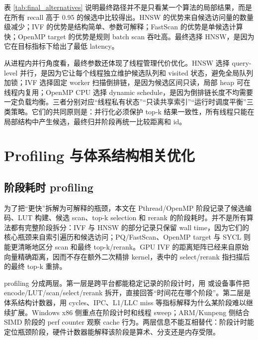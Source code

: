 \documentclass[11pt,a4paper]{article}
\newcommand{\code}[1]{\texttt{\detokenize{#1}}}
\begin{document}
表 \ref{tab:final_alternatives} 说明最终路径并不是只看某一个算法的局部结果，而是在所有 recall 高于 0.95 的候选中比较得出。HNSW 的优势来自候选访问量的数量级减少；IVF 的优势是结构简单、参数可解释；FastScan 的优势是单候选计算快；OpenMP target 的优势是规则 batch scan 吞吐高。最终选择 HNSW，是因为它在目标指标下给出了最低 latency。

从进程内并行角度看，最终参数还体现了线程管理代价优化。HNSW 选择 query-level 并行，是因为它让每个线程独立维护候选队列和 visited 状态，避免全局队列加锁；IVF 选择固定 worker 扫描倒排链，是因为候选区间只读，局部 heap 可在线程内复用；OpenMP CPU 选择 dynamic schedule，是因为倒排链长度不均需要一定负载均衡。三者分别对应“线程私有状态”“只读共享索引”“运行时调度平衡”三类策略。它们的共同原则是：并行化必须保护 top-k 结果一致性，所有线程只能在局部结构中产生候选，最终归并阶段再统一比较距离和 id。

\section{Profiling 与体系结构相关优化}
\label{sec:profiling}

\subsection{阶段耗时 profiling}

为了把“更快”拆解为可解释的瓶颈，本文在 Pthread/OpenMP 阶段记录了候选编码、LUT 构建、候选 scan、top-k selection 和 rerank 的阶段耗时。并不是所有算法都有完整阶段拆分：IVF 与 HNSW 的部分记录只保留 wall time，因为它们的核心瓶颈来自索引遍历和候选访问；PQ/FastScan、OpenMP target 与 SYCL 则能更清晰地区分 scan 和最终 top-k/rerank。GPU IVF 的距离矩阵已经来自原始向量精确距离，因而不存在额外二次精排 kernel，表中的 select/rerank 指扫描后的最终 top-k 重排。

profiling 分成两层。第一层是跨平台都能稳定记录的阶段计时，用 \code{std::chrono} 或设备事件把 encode/LUT/scan/select/rerank 拆开，直接回答“时间花在哪个阶段”。第二层是体系结构计数器，用 cycles、IPC、L1/LLC miss 等指标解释为什么某阶段难以继续扩展。Windows x86 侧重点在阶段计时和线程 sweep；ARM/Kunpeng 侧结合 SIMD 阶段的 perf counter 观察 cache 行为。两层信息不能互相替代：阶段计时能定位瓶颈阶段，硬件计数器能解释该阶段是算术、分支还是内存受限。
\end{document}
